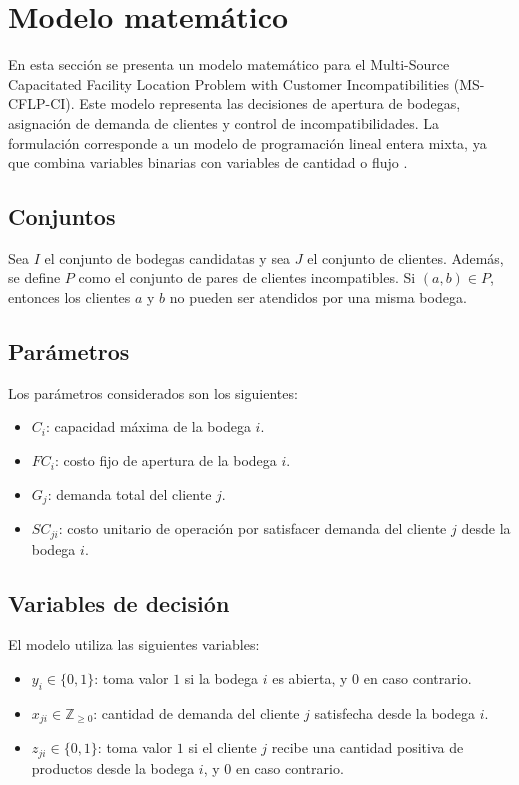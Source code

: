 \section{Modelo matemático}

\noindent En esta sección se presenta un modelo matemático para el Multi-Source Capacitated Facility Location Problem with Customer Incompatibilities (MS-CFLP-CI). Este modelo representa las decisiones de apertura de bodegas, asignación de demanda de clientes y control de incompatibilidades. La formulación corresponde a un modelo de programación lineal entera mixta, ya que combina variables binarias con variables de cantidad o flujo \cite{maia2023metaheuristic,mansini2022kernel,ceschia2024multineighborhood}.

\subsection{Conjuntos}

\noindent Sea $I$ el conjunto de bodegas candidatas y sea $J$ el conjunto de clientes. Además, se define $P$ como el conjunto de pares de clientes incompatibles. Si $(a,b) \in P$, entonces los clientes $a$ y $b$ no pueden ser atendidos por una misma bodega.

\subsection{Parámetros}

\noindent Los parámetros considerados son los siguientes:

\begin{itemize}
    \item $C_i$: capacidad máxima de la bodega $i$.
    \item $FC_i$: costo fijo de apertura de la bodega $i$.
    \item $G_j$: demanda total del cliente $j$.
    \item $SC_{ji}$: costo unitario de operación por satisfacer demanda del cliente $j$ desde la bodega $i$.
\end{itemize}

\subsection{Variables de decisión}

\noindent El modelo utiliza las siguientes variables:

\begin{itemize}
    \item $y_i \in \{0,1\}$: toma valor $1$ si la bodega $i$ es abierta, y $0$ en caso contrario.
    \item $x_{ji} \in \mathbb{Z}_{\geq 0}$: cantidad de demanda del cliente $j$ satisfecha desde la bodega $i$.
    \item $z_{ji} \in \{0,1\}$: toma valor $1$ si el cliente $j$ recibe una cantidad positiva de productos desde la bodega $i$, y $0$ en caso contrario.
\end{itemize}

